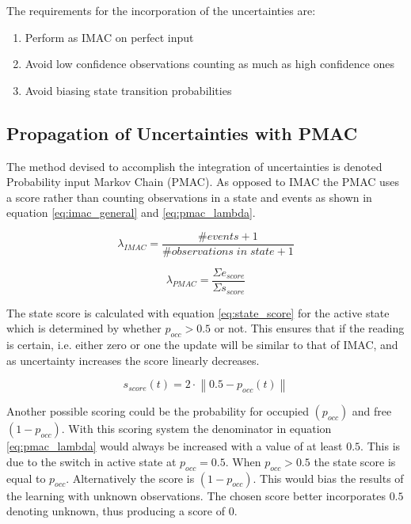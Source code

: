 The requirements for the incorporation of the uncertainties are:
\begin{enumerate}
	\item Perform as IMAC on perfect input
	\item Avoid low confidence observations counting as much as high confidence ones
	\item Avoid biasing state transition probabilities
\end{enumerate}

\subsection{Propagation of Uncertainties with PMAC}
The method devised to accomplish the integration of uncertainties is denoted Probability input Markov Chain (PMAC). 
As opposed to IMAC the PMAC uses a score rather than counting observations in a state and events as shown in equation \ref{eq:imac_general} and \ref{eq:pmac_lambda}. 

\begin{equation}
\lambda_{IMAC} = \frac{\#events + 1}{\#observations\; in\; state + 1}
\label{eq:imac_general}
\end{equation}

\begin{equation}
\lambda_{PMAC} = \frac{\Sigma e_{score}}{\Sigma s_{score}}
\label{eq:pmac_lambda}
\end{equation}

The state score is calculated with equation \ref{eq:state_score} for the active state which is determined by whether \(p_{occ} > 0.5\) or not. This ensures that if the reading is certain, i.e. either zero or one the update will be similar to that of IMAC, and as uncertainty increases the score linearly decreases.

\begin{equation}
s_{score}(t)=2 \cdot \left\|0.5-p_{occ}(t)\right\|
\label{eq:state_score}
\end{equation}

Another possible scoring could be the probability for occupied $(p_{occ})$ and free $(1-p_{occ})$.
With this scoring system the denominator in equation \ref{eq:pmac_lambda}  would always be increased with a value of at least $0.5$.
This is due to the switch in active state at $p_{occ} = 0.5$. When $p_{occ} > 0.5$ the state score is equal to $p_{occ}$. Alternatively the score is $(1-p_{occ})$.
This would bias the results of the learning with unknown observations.
The chosen score better incorporates $0.5$ denoting unknown, thus producing a score of $0$.

